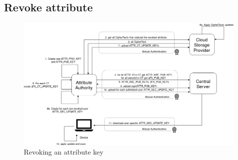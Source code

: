 \subsection{Revoke attribute}
\begin{figure}[!t]
\centering
    \includegraphics[width=1.0\linewidth]{img/attribute_revokation.png}
    \caption{Revoking an attribute key}
    \label{fig:tfdacmacs-attribute-revokation}
\end{figure}




